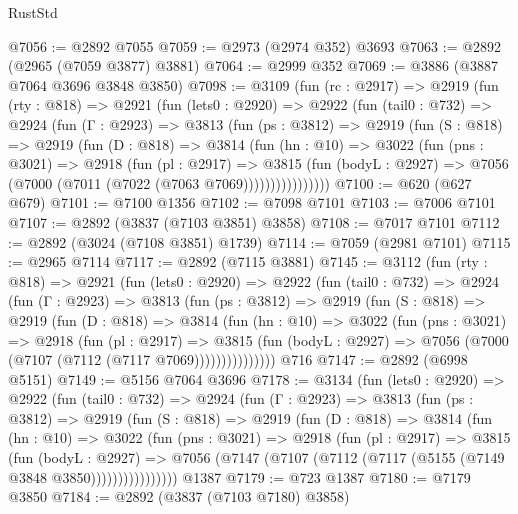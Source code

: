 \begin{lexlean}{RustStd}
\begin{coremodule}
@7056 := @2892 @7055
@7059 := @2973 (@2974 @352) @3693
@7063 := @2892 (@2965 (@7059 @3877) @3881)
@7064 := @2999 @352
@7069 := @3886 (@3887 @7064 @3696 @3848 @3850)
@7098 := @3109
    (fun (rc : @2917) =>
    @2919
      (fun (rty : @818) =>
      @2921
        (fun (lets0 : @2920) =>
        @2922
          (fun (tail0 : @732) =>
          @2924
            (fun (Γ : @2923) =>
            @3813
              (fun (ps : @3812) =>
              @2919
                (fun (S : @818) =>
                @2919
                  (fun (D : @818) =>
                  @3814
                    (fun (hn : @10) =>
                    @3022
                      (fun (pns : @3021) =>
                      @2918
                        (fun (pl : @2917) =>
                        @3815
                          (fun (bodyL : @2927) =>
                          @7056 (@7000 (@7011 (@7022 (@7063 @7069))))))))))))))))
@7100 := @620 (@627 @679)
@7101 := @7100 @1356
@7102 := @7098 @7101
@7103 := @7006 @7101
@7107 := @2892 (@3837 (@7103 @3851) @3858)
@7108 := @7017 @7101
@7112 := @2892 (@3024 (@7108 @3851) @1739)
@7114 := @7059 (@2981 @7101)
@7115 := @2965 @7114
@7117 := @2892 (@7115 @3881)
@7145 := @3112
    (fun (rty : @818) =>
    @2921
      (fun (lets0 : @2920) =>
      @2922
        (fun (tail0 : @732) =>
        @2924
          (fun (Γ : @2923) =>
          @3813
            (fun (ps : @3812) =>
            @2919
              (fun (S : @818) =>
              @2919
                (fun (D : @818) =>
                @3814
                  (fun (hn : @10) =>
                  @3022
                    (fun (pns : @3021) =>
                    @2918
                      (fun (pl : @2917) =>
                      @3815
                        (fun (bodyL : @2927) =>
                        @7056 (@7000 (@7107 (@7112 (@7117 @7069)))))))))))))))
    @716
@7147 := @2892 (@6998 @5151)
@7149 := @5156 @7064 @3696
@7178 := @3134
    (fun (lets0 : @2920) =>
    @2922
      (fun (tail0 : @732) =>
      @2924
        (fun (Γ : @2923) =>
        @3813
          (fun (ps : @3812) =>
          @2919
            (fun (S : @818) =>
            @2919
              (fun (D : @818) =>
              @3814
                (fun (hn : @10) =>
                @3022
                  (fun (pns : @3021) =>
                  @2918
                    (fun (pl : @2917) =>
                    @3815
                      (fun (bodyL : @2927) =>
                      @7056 (@7147 (@7107 (@7112 (@7117 (@5155 (@7149 @3848 @3850))))))))))))))))
    @1387
@7179 := @723 @1387
@7180 := @7179 @3850
@7184 := @2892 (@3837 (@7103 @7180) @3858)

\end{coremodule}
\end{lexlean}
